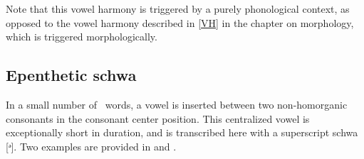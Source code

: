 Note that this vowel harmony is triggered by a purely phonological context, as opposed to the vowel harmony described in \SEC\ref{VH} in the chapter on morphology, which is triggered morphologically. 


\subsection{Epenthetic schwa}\label{epentheticSchwa}
In a small number of \PS\ words, a vowel is inserted between two non-homorganic consonants in the consonant center position. %
This centralized vowel is exceptionally short in duration, and is transcribed here with a %
superscript schwa [ᵊ]. Two examples are provided in  and .


